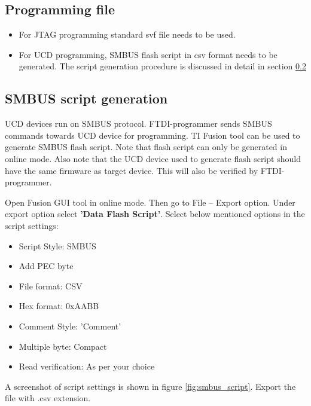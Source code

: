 \documentclass[a4paper,12pt]{report}%
\begin{document}
	\subsection{Programming file}
	\begin{itemize}
		\item
		For JTAG programming standard svf file needs to be used.
		
		\item
		For UCD programming, SMBUS flash script in csv format needs to be generated. The script generation procedure is
		discussed in detail in section \ref{sec:script}
		
		
	\end{itemize}	
	
	
	\subsection{SMBUS script generation}\label{sec:script}
	UCD devices run on SMBUS protocol. FTDI-programmer sends SMBUS commands towards UCD device for programming. TI Fusion
	tool can be used to generate SMBUS flash script. Note that flash script can only be generated in online mode. Also note
	that the UCD device used to generate flash script should have the same firmware as target device. This will also be verified by
	FTDI-programmer.
	
	Open Fusion GUI tool in online mode. Then go to File -- Export option. Under export option select \textbf{'Data Flash Script'}.
	Select below mentioned options in the script settings:
	\begin{itemize}
		\item
		Script Style: SMBUS
		\item
		Add PEC byte
		\item
		File format: CSV
		\item
		Hex format: 0xAABB
		\item
		Comment Style: 'Comment'
		\item
		Multiple byte: Compact
		\item
		Read verification: As per your choice
	\end{itemize}	

	A screenshot of script settings is shown in figure \ref{fig:smbus_script}. Export the file with .csv extension.
	
	
	
\end{document}
